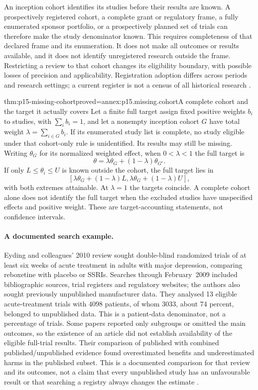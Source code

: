 An inception cohort identifies its studies before their results are
known. A prospectively registered cohort, a complete grant or regulatory
frame, a fully enumerated sponsor portfolio, or a prospectively planned
set of trials can therefore make the study denominator known.
This requires completeness of that declared frame and its enumeration.
It does not make all outcomes or results available, and it does not
identify unregistered research outside the frame. Restricting a review
to that cohort changes its eligibility boundary, with possible losses
of precision and applicability. Registration adoption differs across
periods and research settings; a current register is not a census of
all historical research \cite[sec.~13.2.2]{PageHigginsSterne2024Cochrane13}.

\begin{hbtheorem}{thm:p15-missing-cohort}{proved=annex:p15.missing.cohort}{A complete cohort and the target it actually covers}
Let a finite full target assign fixed positive weights \(b_i\) to
studies, with \(\sum_i b_i=1\), and let a nonempty inception
cohort \(G\) have total weight \(\lambda=\sum_{i\in G}b_i\).
If its enumerated study list is complete, no study eligible under that
cohort-only rule is unidentified. Its results may still be missing.
Writing \(\theta_G\) for its normalized weighted effect, when
\(0<\lambda<1\) the full target is
\[
                \theta=\lambda\theta_G+(1-\lambda)\theta_{G^c}.
\]
If only \(L\leq\theta_i\leq U\) is known outside the cohort,
the full target lies in
\[
 [\lambda\theta_G+(1-\lambda)L,
                  \lambda\theta_G+(1-\lambda)U],
\]
with both extremes attainable. At \(\lambda=1\) the targets
coincide. A complete cohort alone does not identify the full target
when the excluded studies have unspecified effects and positive weight.
These are target-accounting statements, not confidence intervals.
\end{hbtheorem}

\paragraph{A documented search example.}
Eyding and colleagues' 2010 review sought double-blind randomized trials
of at least six weeks of acute treatment in adults with major depression,
comparing reboxetine with placebo or SSRIs. Searches through February~2009
included bibliographic sources, trial registers and regulatory websites;
the authors also sought previously unpublished manufacturer data.
They analysed 13 eligible acute-treatment trials with 4098 patients,
of whom 3033, about 74 percent, belonged to unpublished data. This is
a patient-data denominator, not a percentage of trials.
Some papers reported only subgroups or omitted the main outcomes, so
the existence of an article did not establish availability of the
eligible full-trial results. Their comparison of published with combined
published/unpublished evidence found overestimated benefits and
underestimated harms in the published subset. This is a documented
comparison for that review and its outcomes, not a claim that every
unpublished study has an unfavourable result or that searching a registry
always changes the estimate \cite[Methods, Study selection and Publication bias]{EydingEtAl2010MissingEvidence}.

